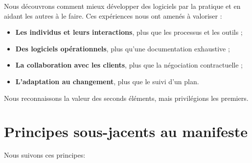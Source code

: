 \label{manifeste_agile}


Nous découvrons comment mieux développer des logiciels par la pratique et en aidant les autres à le faire.
Ces expériences nous ont amenés à valoriser :

\begin{itemize}
\item \textbf{Les individus et leurs interactions}, plus que les processus et les outils ;

\item \textbf{Des logiciels opérationnels}, plus qu’une documentation exhaustive ;

\item \textbf{La collaboration avec les clients}, plus que la négociation contractuelle ;

\item \textbf{L’adaptation au changement}, plus que le suivi d’un plan.

\end{itemize}

Nous reconnaissons la valeur des seconds éléments, mais privilégions les premiers.

\section*{Principes sous-jacents au manifeste}

Nous suivons ces principes:

